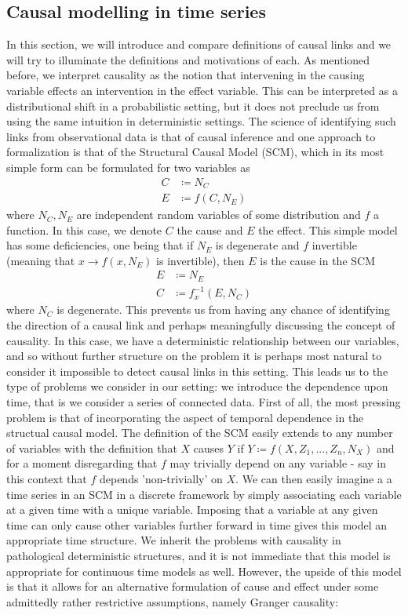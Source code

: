 \documentclass[11pt, a4paper]{memoir}
\theoremstyle{plain}
\theoremstyle{definition}
\begin{document}
\subsection{Causal modelling in time series}
In this section, we will introduce and compare definitions of causal links and we will try to illuminate the definitions and motivations of each. As mentioned before, we interpret causality as the notion that intervening in the causing variable effects an intervention in the effect variable. This can be interpreted as a distributional shift in a probabilistic setting, but it does not preclude us from using the same intuition in deterministic settings. The science of identifying such links from observational data is that of causal inference and one approach to formalization is that of the Structural Causal Model (SCM), which in its most simple form can be formulated for two variables as
\begin{align*}
C&\coloneqq N_C\\
E&\coloneqq f(C,N_E)
\end{align*}
where $N_C,N_E$ are independent random variables of some distribution and $f$ a function. In this case, we denote $C$ the cause and $E$ the effect. This simple model has some deficiencies, one being that if $N_E$ is degenerate and $f$ invertible (meaning that $x\to f(x,N_E)$ is invertible), then $E$ is the cause in the SCM
\begin{align*}
E&\coloneqq N_E\\
C&\coloneqq f_x^{-1}(E,N_C)
\end{align*}
where $N_C$ is degenerate. This prevents us from having any chance of identifying the direction of a causal link and perhaps meaningfully discussing the concept of causality. In this case, we have a deterministic relationship between our variables, and so without further structure on the problem it is perhaps most natural to consider it impossible to detect causal links in this setting. This leads us to the type of problems we consider in our setting: we introduce the dependence upon time, that is we consider a series of connected data. First of all, the most pressing problem is that of incorporating the aspect of temporal dependence in the structual causal model. The definition of the SCM easily extends to any number of variables with the definition that $X$ causes $Y$ if $Y\coloneqq f(X,Z_1,...,Z_n,N_X)$ and for a moment disregarding that $f$ may trivially depend on any variable - say in this context that $f$ depends 'non-trivially' on $X$. We can then easily imagine a a time series in an SCM in a discrete framework by simply associating each variable at a given time with a unique variable. Imposing that a variable at any given time can only cause other variables further forward in time gives this model an appropriate time structure. We inherit the problems with causality in pathological deterministic structures, and it is not immediate that this model is appropriate for continuous time models as well. However, the upside of this model is that it allows for an alternative formulation of cause and effect under some admittedly rather restrictive assumptions, namely Granger causality:\\
\end{document}
